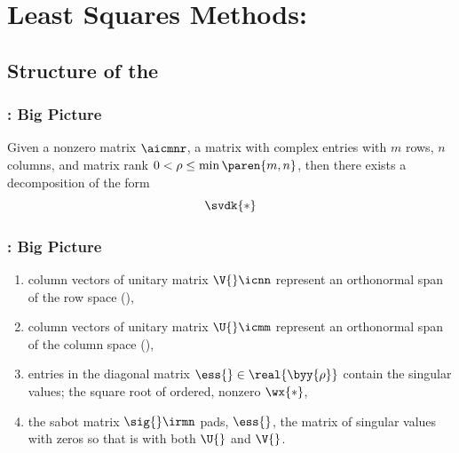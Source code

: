 \section{Least Squares Methods: \bsvd}

% 

\subsection{Structure of the \bsvd}

\begin{frame}
\frametitle{\bsvd: Big Picture}
	{\large{
Given a nonzero matrix $\aicmnr$, a matrix with complex entries with $m$ rows, $n$ columns, and matrix rank $0<\rho\le\min\paren{m,n}$, then there exists a decomposition of the form
%
\begin{equation}
	\svdk{*}
\label{eq:svdk}
\end{equation}
	}}
\end{frame}

\begin{frame}
\frametitle{\bsvd: Big Picture}
	{\large{
\begin{enumerate}
  \item column vectors of unitary matrix $\V{}\icnn$ represent an orthonormal span of the row space (),
  \item column vectors of unitary matrix $\U{}\icmm$ represent an orthonormal span of the column space (),
  \item entries in the diagonal matrix $\ess{}\in\real{\byy{\rho}}$ contain the singular values; the square root of ordered, nonzero  $\wx{*}$,
  \item the sabot matrix $\sig{}\irmn$ pads, $\ess{}$, the matrix of singular values with zeros so that is  with both $\U{}$ and $\V{}$.
\end{enumerate}
	}}
\end{frame}

